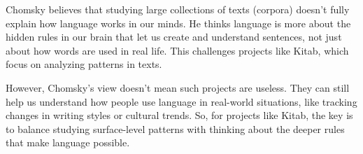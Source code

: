 \documentclass[a4paper]{exam}
\begin{document}
\begin{questions}
Chomsky believes that studying large collections of texts (corpora) doesn’t fully explain how language works in our minds. He thinks language is more about the hidden rules in our brain that let us create and understand sentences, not just about how words are used in real life. This challenges projects like Kitab, which focus on analyzing patterns in texts.

However, Chomsky’s view doesn’t mean such projects are useless. They can still help us understand how people use language in real-world situations, like tracking changes in writing styles or cultural trends. So, for projects like Kitab, the key is to balance studying surface-level patterns with thinking about the deeper rules that make language possible.





\vspace{6cm}



\end{questions}
\end{document}
